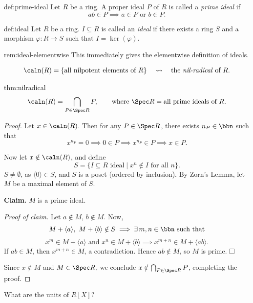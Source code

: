 \begin{definition}{}{def:prime-ideal}
Let $R$ be a ring. A proper ideal $P$ of $R$ is called a \emph{prime ideal} if
\[
ab \in P \implies a \in P \text{ or } b \in P.
\]
\end{definition}

\begin{definition}{}{def:ideal}
Let $R$ be a ring. $I \subseteq R$ is called an \emph{ideal} if there exists a ring $S$ and a morphism $\varphi: R \to S$ such that $I = \ker(\varphi)$.
\end{definition}

\begin{remark}{}{rem:ideal-elementwise}
This immediately gives the elementwise definition of ideals.
\end{remark}

\[
\caln(R) = \{\text{all nilpotent elements of } R\} \quad \leadsto \quad \text{the \emph{nil-radical} of } R.
\]

\begin{theorem}{}{thm:nilradical}
\[
\caln(R) = \bigcap_{P \in \Spec R} P, \qquad \text{where } \Spec R = \text{all prime ideals of } R.
\]
\end{theorem}

\begin{proof}
Let $x \in \caln(R)$. Then for any $P \in \Spec R$, there exists $n_P \in \bbn$ such that
\[
x^{n_P} = 0 \implies 0 \in P \implies x^{n_P} \in P \implies x \in P.
\]

Now let $x \notin \caln(R)$, and define
\[
S = \{ I \subseteq R \text{ ideal} \mid x^n \notin I \text{ for all } n \}.
\]
$S \neq \emptyset$, as $\langle 0 \rangle \in S$, and $S$ is a poset (ordered by inclusion). By Zorn's Lemma, let $M$ be a maximal element of $S$.

\textbf{Claim.} $M$ is a prime ideal.

\emph{Proof of claim.} Let $a \notin M$, $b \notin M$. Now,
\[
M + \langle a \rangle, \ M + \langle b \rangle \notin S \implies \exists\, m, n \in \bbn \text{ such that}
\]
\[
x^m \in M + \langle a \rangle \text{ and } x^n \in M + \langle b \rangle \implies x^{m+n} \in M + \langle ab \rangle.
\]
If $ab \in M$, then $x^{m+n} \in M$, a contradiction. Hence $ab \notin M$, so $M$ is prime. $\hfill\square$

Since $x \notin M$ and $M \in \Spec R$, we conclude $x \notin \bigcap_{P \in \Spec R} P$, completing the proof.
\end{proof}

\begin{question}
What are the units of $R[X]$?
\end{question}

